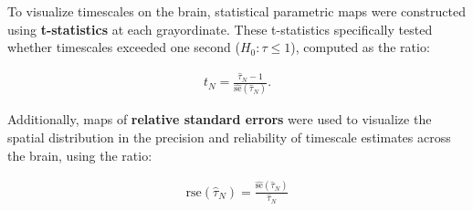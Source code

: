\documentclass[main.tex]{subfiles}
\begin{document}
To visualize timescales on the brain, statistical parametric maps were constructed using \textbf{t-statistics} at each grayordinate. These t-statistics specifically tested whether timescales exceeded one second  ($H_0: \tau \le 1$), computed as the ratio:

\begin{align}\label{eq:t-ratio}
    t_N = \frac{\hat\tau_N-1}{\widehat{\text{se}}(\hat\tau_N)}.
\end{align}

\noindent Additionally, maps of \textbf{relative standard errors} were used to visualize the spatial distribution in the precision and reliability of timescale estimates across the brain, using the ratio:

\begin{align}
    \text{rse}(\hat\tau_N) = \frac{\widehat{\text{se}}(\hat\tau_N)}{\hat\tau_N}
\end{align}
\end{document}
